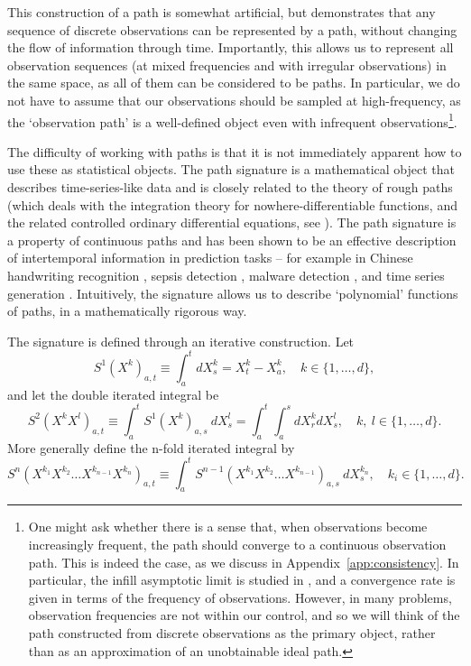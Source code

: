 \documentclass[a4paper, 12pt]{article}
\theoremstyle{remark}
\begin{document}
This construction of a path is somewhat artificial, but demonstrates that any sequence of discrete observations can be represented by a path, without changing the flow of information through time. Importantly, this allows us to represent all observation sequences (at mixed frequencies and with irregular observations) in the same space, as all of them can be considered to be paths. In particular, we do not have to assume that our observations should be sampled at high-frequency, as the `observation path' is a well-defined object even with infrequent observations\footnote{One might ask whether there is a sense that, when observations become increasingly frequent, the path should converge to a continuous observation path. This is indeed the case, as we discuss in Appendix~\ref{app:consistency}. In particular, the infill asymptotic limit is studied in \cite{lucchese2025learning}, and a convergence rate is given in terms of the frequency of observations. However, in many problems, observation frequencies are not within our control, and so we will think of the path constructed from discrete observations as the primary object, rather than as an approximation of an unobtainable ideal path.}.

The difficulty of working with paths is that it is not immediately apparent how to use these as statistical objects. The path signature is a mathematical object that describes time-series-like data and is closely related to the theory of rough paths (which deals with the integration theory for nowhere-differentiable functions, and the related controlled ordinary differential equations, see \citet{friz2020course}). The path signature is a property of continuous paths and has been shown to be an effective description of intertemporal information in prediction tasks -- for example in Chinese handwriting recognition \citep{graham2013sparse}, sepsis detection \citep{morrill2020utilization}, malware detection \citep{cochrane2021sk-tree}, and time series generation \citep{ni2021sig-wasserstein}. Intuitively, the signature allows us to describe `polynomial' functions of paths, in a mathematically rigorous way.

The signature is defined through an iterative construction. Let
    \begin{equation*}
        S^1(X^k)_{a,t} \equiv \int_{a}^t dX_s^{k} = X_t^{k} - X_a^{k}, \quad k \in \{1, \dots, d\},
    \end{equation*}
     and let the double iterated integral be
    \begin{equation*}
        S^2(X^{k}X^l)_{a,t} \equiv \int_a^t S^1(X^k)_{a,s} \: dX_s^{l} = \int_a^t\int_a^s dX_r^{k}dX_s^{l}, \quad k, \: l \in \{1, \dots, d\}.
    \end{equation*}
More generally define the n-fold iterated integral by
\begin{equation*}
    S^n(X^{k_1}X^{k_2}\dots X^{k_{n-1}} X^{k_n})_{a,t} \equiv \int_a^t S^{n-1}(X^{k_1}X^{k_2}\dots X^{k_{n-1}})_{a,s} \: dX_s^{k_n}, \quad k_i \in \{1, \dots, d\}.
\end{equation*}
    
\end{document}
